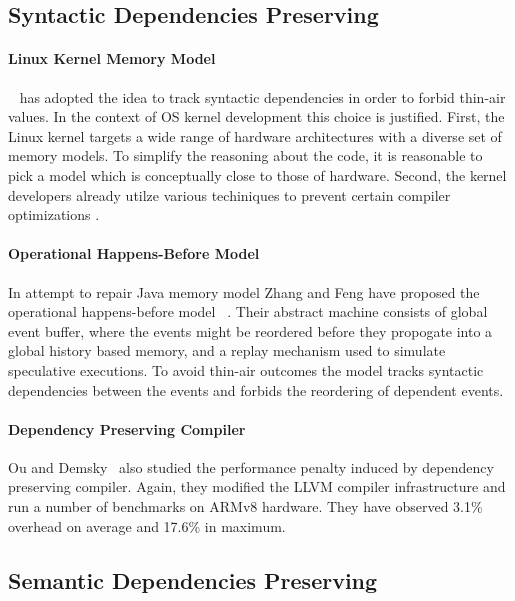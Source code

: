 \subsection{Syntactic Dependencies Preserving}
\label{sec:catalog:deprf}

\paragraph{Linux Kernel Memory Model}

\LKMM~\cite{Alglave-al:ASPLOS18} has adopted 
the idea to track syntactic dependencies in order to 
forbid thin-air values. In the context of OS kernel development 
this choice is justified. First, the Linux kernel targets 
a wide range of hardware architectures with a diverse
set of memory models. To simplify the reasoning about the code, 
it is reasonable to pick a model which is conceptually close
to those of hardware. Second, the kernel developers 
already utilze various techiniques to prevent 
certain compiler optimizations%
\cite{Alglave-al:ASPLOS18, LK-MemBarriers, LK-RCU-Deref}.

\paragraph{Operational Happens-Before Model}

In attempt to repair Java memory model Zhang and Feng have proposed the 
operational happens-before model \OHMM~\cite{Zhang-Feng:FCS16}.
Their abstract machine consists of global event buffer,
where the events might be reordered before they propogate into  
a global history based memory, and a replay mechanism 
used to simulate speculative executions. 
To avoid thin-air outcomes the model tracks syntactic dependencies 
between the events and forbids the reordering of dependent events. 

\paragraph{Dependency Preserving Compiler}

Ou and Demsky~\cite{Ou-Demsky:OOPSLA18} also studied 
the performance penalty induced by dependency preserving compiler. 
Again, they modified the LLVM compiler infrastructure 
and run a number of benchmarks on ARMv8 hardware. 
They have observed 3.1\% overhead on average and 17.6\% in maximum. 

\subsection{Semantic Dependencies Preserving}
\label{sec:catalog:sdeprf}

